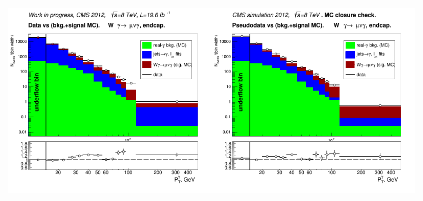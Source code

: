 \begin{figure}[htb]
  \begin{center}
   \includegraphics[width=0.48\textwidth]{../figs/figs_v11/MUON_WGamma/PrepareYields/c_DATAvsBkgPlusSigMCc_MUON_WGamma_TEMPL_CHISO_UNblind__Endcap__phoEt.png}\includegraphics[width=0.48\textwidth]{../figs/figs_v11/MUON_WGamma/PrepareYields/c_DATAvsBkgPlusSigMCc_MUON_WGamma_TEMPL_CHISO_UNblind_MCclosure__Endcap__phoEt_MCclosure.png}\\

\end{center}
\end{figure}
